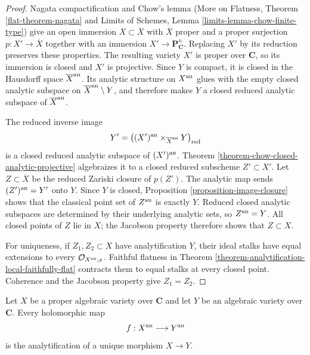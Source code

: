 \begin{proof}
Nagata compactification and Chow's lemma (More on Flatness, Theorem
\ref{flat-theorem-nagata} and Limits of Schemes, Lemma
\ref{limits-lemma-chow-finite-type}) give an open immersion
$X\subset\overline X$ with $\overline X$ proper and a proper surjection
$p:X'\to\overline X$ together with an immersion
$X'\to\mathbf P^n_{\mathbf C}$. Replacing $X'$ by its reduction preserves
these properties. The resulting variety $X'$ is proper over $\mathbf C$,
so its immersion is closed and $X'$ is projective. Since $Y$ is compact,
it is closed in the Hausdorff space $\overline X^{\rm an}$. Its analytic structure on
$X^{\rm an}$ glues with the empty closed analytic subspace on
$\overline X^{\rm an}\setminus Y$, and therefore makes $Y$ a closed reduced
analytic subspace of $\overline X^{\rm an}$.

The reduced inverse image
$$
Y'=\left((X')^{\rm an}\times_{\overline X^{\rm an}}Y\right)_{\rm red}
$$
is a closed reduced analytic subspace of $(X')^{\rm an}$. Theorem
\ref{theorem-chow-closed-analytic-projective} algebraizes it to a closed
reduced subscheme $Z'\subset X'$. Let $Z\subset\overline X$ be the reduced
Zariski closure of $p(Z')$. The analytic map sends $(Z')^{\rm an}=Y'$ onto
$Y$. Since $Y$ is closed, Proposition \ref{proposition-image-closure}
shows that the classical point set of $Z^{\rm an}$ is exactly $Y$.
Reduced closed analytic subspaces are determined by their underlying
analytic sets, so $Z^{\rm an}=Y$. All closed points of $Z$ lie in $X$;
the Jacobson property therefore shows that $Z\subset X$.

For uniqueness, if $Z_1,Z_2\subset X$ have analytification $Y$, their ideal
stalks have equal extensions to every $\mathcal O_{X^{\rm an},x}$.
Faithful flatness in Theorem
\ref{theorem-analytification-local-faithfully-flat} contracts them to equal
stalks at every closed point. Coherence and the Jacobson property give
$Z_1=Z_2$.
\end{proof}

\begin{proposition}
\label{proposition-holomorphic-map-from-proper-is-regular}
\begin{reference}
\cite[\S 4, no. 19, Proposition 15]{GAGA}
\end{reference}
Let $X$ be a proper algebraic variety over $\mathbf C$ and let $Y$ be an
algebraic variety over $\mathbf C$. Every holomorphic map
$$
f:X^{\rm an}\longrightarrow Y^{\rm an}
$$
is the analytification of a unique morphism $X\to Y$.
\end{proposition}

